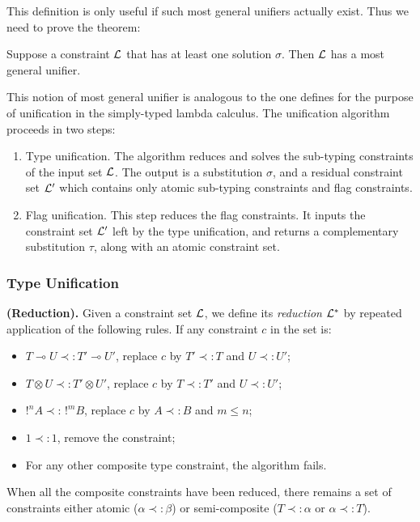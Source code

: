 This definition is only useful if such most general unifiers actually exist. Thus we need to prove the theorem:
\begin{thm}
	\label{existence-MGU}
	Suppose a constraint $\mathcal{L}$ that has at least one solution $\sigma$. Then $\mathcal{L}$ has a most general unifier.
\end{thm}

This notion of most general unifier is analogous to the one defines for the purpose of unification in the simply-typed lambda calculus.
The unification algorithm proceeds in two steps:
	\begin{enumerate}
		\item Type unification. The algorithm reduces and solves the sub-typing constraints of the input set $\mathcal{L}$.
			The output is a substitution $\sigma$, and a residual constraint set $\mathcal{L}'$ which contains only atomic sub-typing constraints and
			flag constraints.
			
		\item Flag unification. This step reduces the flag constraints. It inputs the constraint set $\mathcal{L}'$ left by the type unification,
			and returns a complementary substitution $\tau$, along with an atomic constraint set.
	\end{enumerate}

\subsubsection{Type Unification}

\begin{algorithm}{\bf (Reduction).}
  Given a constraint set $\mathcal{L}$, we define its {\em reduction} $\mathcal{L}^*$ by repeated application of the following rules.
  If any constraint $c$ in the set is:
  	\begin{itemize}
      \item $T \multimap U \prec: T' \multimap U'$, replace $c$ by $T' \prec: T$ and $U \prec: U'$;
      \item $T \otimes U \prec: T' \otimes U'$, replace $c$ by $T \prec: T'$ and $U \prec: U'$;
      \item $!^n A \prec: \, !^m B$, replace $c$ by $A \prec: B$ and $m \le n$;
      \item $1 \prec: 1$, remove the constraint;
      \item For any other composite type constraint, the algorithm fails.
    \end{itemize}
  When all the composite constraints have been reduced, there remains a set of constraints either atomic ($\alpha \prec: \beta$) or
  semi-composite ($T \prec: \alpha$ or $\alpha \prec: T$).
\end{algorithm}

